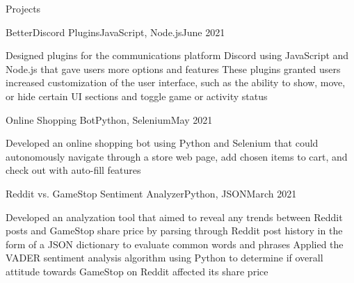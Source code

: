 \documentclass[fontsize=11pt,fontface=cormorantgaramond,fitpage]{cvtemplate}
\begin{document}
\begin{cvtext}

\begin{cvsection}{Projects}






  \begin{cvsubsection}
    {BetterDiscord Plugins}{JavaScript, Node.js}{June 2021}{}

    \listitem Designed plugins for the communications platform Discord using JavaScript and Node.js that gave users more options and features
    \listitem These plugins granted users increased customization of the user interface, such as the ability to show, move, or hide certain UI sections and toggle game or activity status

  \end{cvsubsection}


  \begin{cvsubsection}
    {Online Shopping Bot}{Python, Selenium}{May 2021}{}

    \listitem Developed an online shopping bot using Python and Selenium that could autonomously navigate through a store web page, add chosen items to cart, and check out with auto-fill features

  \end{cvsubsection}


  \begin{cvsubsection}
    {Reddit vs. GameStop Sentiment Analyzer}{Python, JSON}{March 2021}{}

    \listitem  Developed an analyzation tool that aimed to reveal any trends between Reddit posts and GameStop share price by parsing through Reddit post history in the form of a JSON dictionary to evaluate common words and phrases
    \listitem  Applied the VADER sentiment analysis algorithm using Python to determine if overall attitude towards GameStop on Reddit affected its share price


\end{cvsubsection}
\end{cvsection}
\end{cvtext}
\end{document}
